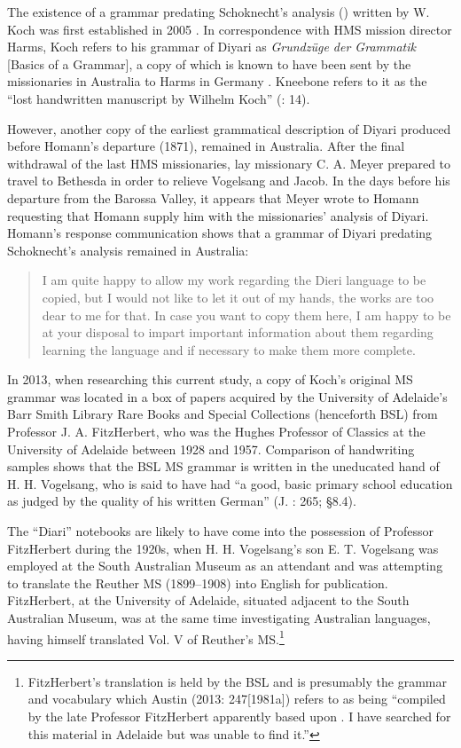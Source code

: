 The existence of a grammar predating Schoknecht’s analysis (\citeyear{Schoknecht1872}) written by W. Koch was first established in 2005 \citep[13--14]{kneebone_teichelmann_2005}. In correspondence with HMS mission director Harms, Koch refers to his grammar of Diyari as \textit{Grundzüge der Grammatik} [Basics of a Grammar], a copy of which is known to have been sent by the missionaries in Australia to Harms in Germany \citep[297]{harms_traume_2003}. Kneebone refers to it as the “lost handwritten manuscript by Wilhelm Koch” (\citeyear{kneebone_teichelmann_2005}: 14).

However, another copy of the earliest grammatical description of Diyari produced before Homann’s departure (1871), remained in Australia. After the final withdrawal of the last HMS missionaries, lay missionary C. A. Meyer prepared to travel to Bethesda in order to relieve Vogelsang and Jacob. In the days before his departure from the Barossa Valley, it appears that Meyer wrote to Homann requesting that Homann supply him with the missionaries' analysis of Diyari. Homann’s response communication shows that a grammar of Diyari predating Schoknecht’s analysis remained in Australia:

\begin{quote}
I am quite happy to allow my work regarding the Dieri language to be copied, but I would not like to let it out of my hands, the works are too dear to me for that. In case you want to copy them here, I am happy to be at your disposal to impart important information about them regarding learning the language and if necessary to make them more complete. \citep{homann_letter_1875}
\end{quote}

In 2013, when researching this current study, a copy of Koch’s original MS grammar was located in a box of papers acquired by the University of Adelaide’s Barr Smith Library Rare Books and Special Collections (henceforth BSL) from Professor J. A. FitzHerbert, who was the Hughes Professor of Classics at the University of Adelaide between 1928 and 1957. Comparison of handwriting samples shows that the BSL MS grammar is written in the uneducated hand of H. H. Vogelsang, who is said to have had “a good, basic primary school education as judged by the quality of his written German'' (J. \citealt{strehlow_tale_2011}: 265; \citealt{Stockigt2017} §8.4).

The “Diari” notebooks are likely to have come into the possession of Professor FitzHerbert during the 1920s, when H. H. Vogelsang’s son E. T. Vogelsang was employed at the South Australian Museum as an attendant and was attempting to translate the Reuther MS (1899--1908) into English for publication. FitzHerbert, at the University of Adelaide, situated adjacent to the South Australian Museum, was at the same time investigating Australian languages, having himself translated Vol. V of Reuther’s MS.\footnote{FitzHerbert’s translation is held by the BSL and is presumably the grammar and vocabulary which Austin (2013: 247[1981a]) refers to as being “compiled by the late Professor FitzHerbert apparently based upon \citet{reuther_ms_1899}. I have searched for this material in Adelaide but was unable to find it.”}

